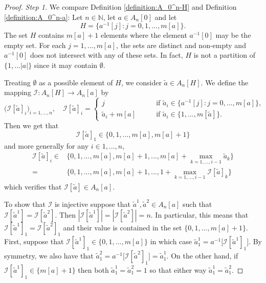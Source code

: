 \documentclass[a4paper,11pt,twoside]{article}
\numberwithin{equation}{section}
\theoremstyle{plain}
\newcommand{\bN}{\mathbb{N}}
\newcommand{\cI}{\mathcal{I}}
\newcommand{\1}{\mathbbm{1}}
\begin{document}
	\begin{proof}
		\textit{Step 1.}
		We compare Definition \ref{definition:A_0^n-H} and Definition \ref{definition:A_0^n-a}:  Let $n\in \bN$, let $a\in A_n[0]$ and let
		\begin{equation}
			\label{eq:lemma:A_0^n-H(and)A_0^n-a_2}
			H = \Big\{ a^{-1}[j]: j=0, 1, ..., m[a] \Big\}. 
		\end{equation}
		The set $H$ contains $m[a]+1$ elements where the element $a^{-1}[0]$ may be the empty set. For each $j=1, ..., m[a]$, the sets are distinct and non-empty and $a^{-1}[0]$ does not intersect with any of these sets. In fact, $H$ is not a partition of $\{1, ... |a|\}$ since it may contain $\emptyset$. 
		
		Treating $\emptyset$ as a possible element of $H$, we consider $\tilde{a} \in A_n[H]$. We define the mapping $\cI: A_n[H] \to A_n[a]$ by
		\begin{equation}
			\label{eq:lemma:A_0^n-H(and)A_0^n-a_3}
			\big( \cI[\tilde{a}]_i \big)_{i=1, ..., n}, 
			\quad 
			\cI[\tilde{a}]_i = 
			\begin{cases}
				j \quad & \quad \mbox{if $\tilde{a}_i \in \big\{ a^{-1}[j]: j=0, ..., m[a] \big\}$,}
				\\
				\tilde{a}_i + m[a] \quad & \quad \mbox{if $\tilde{a}_i \in \big\{ 1, ..., m[\tilde{a}] \big\}$}. 
			\end{cases}
		\end{equation}
		Then we get that
		$$
		\cI[\tilde{a}]_1 \in \big\{ 0, 1, ..., m[a], m[a] +1 \big\}
		$$
		and more generally for any $i\in 1, ..., n$, 
		\begin{align*}
			\cI[\tilde{a}]_i \in& \Big\{ 0, 1, ..., m[a], m[a] +1, ..., m[a] + \max_{k=1, ..., i-1} \tilde{a}_k \Big\}
			\\
			=& \Big\{ 0, 1, ..., m[a], m[a] +1, ..., 1+ \max_{k=1, ..., i-1} \cI[\tilde{a}]_k \Big\}
		\end{align*}
		which verifies that $\cI[\tilde{a}] \in A_n[a]$. 
		
		To show that $\cI$ is injective suppose that $\tilde{a}^1, \tilde{a}^2\in A_n[a]$ such that $\cI[\tilde{a}^1] = \cI[\tilde{a}^2]$. Then $|\cI[\tilde{a}^1]| = |\cI[\tilde{a}^2]| = n$. In particular, this means that $\cI[\tilde{a}^1]_1 = \cI[\tilde{a}^2]_1$ and their value is contained in the set $\{0, 1, ..., m[a]+1 \}$. First, suppose that $\cI[\tilde{a}^1]_1 \in \{0, 1, ..., m[a]\}$ in which case $\tilde{a}_1^1 = a^{-1}\big[ \cI[\tilde{a}^1]_1 \big]$. By symmetry, we also have that $\tilde{a}_1^2 = a^{-1}\big[ \cI[\tilde{a}^2]_1 \big] = \tilde{a}_1^1$. On the other hand, if $\cI[\tilde{a}^1]_1 \in \{m[a]+1\}$ then both $\tilde{a}_1^1 = \tilde{a}_1^2 = 1$ so that either way $\tilde{a}_1^1 = \tilde{a}_1^2$. 
		

\end{proof}
\end{document}
